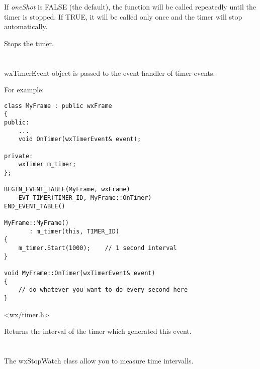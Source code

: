 If {\it oneShot} is FALSE (the default), the  
function will be called repeatedly until the timer is stopped. If TRUE,
it will be called only once and the timer will stop automatically.

\label{wxtimerstop}


Stops the timer.

\section{}\label{wxtimerevent}

wxTimerEvent object is passed to the event handler of timer events.

For example:

\begin{verbatim}
class MyFrame : public wxFrame
{
public:
    ...
    void OnTimer(wxTimerEvent& event);

private:
    wxTimer m_timer;
};

BEGIN_EVENT_TABLE(MyFrame, wxFrame)
    EVT_TIMER(TIMER_ID, MyFrame::OnTimer)
END_EVENT_TABLE()

MyFrame::MyFrame()
       : m_timer(this, TIMER_ID)
{
    m_timer.Start(1000);    // 1 second interval
}

void MyFrame::OnTimer(wxTimerEvent& event)
{
    // do whatever you want to do every second here
}

\end{verbatim}


<wx/timer.h>




\label{wxtimereventgetinterval}


Returns the interval of the timer which generated this event.

\section{}\label{wxstopwatch}

The wxStopWatch class allow you to measure time intervalls. 

